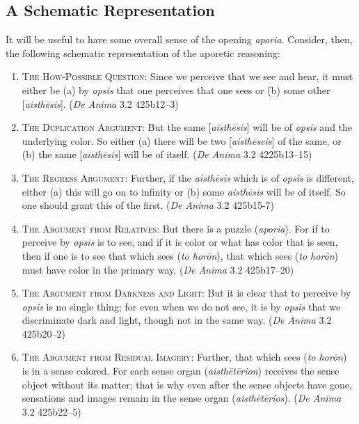 \subsection{A Schematic Representation} %
\label{sub:a_schematic_representation}

It will be useful to have some overall sense of the opening \emph{aporia}. Consider, then, the following schematic representation of the aporetic reasoning:

\begin{enumerate}[(1)]
	\item \textsc{The How-Possible Question}: Since we perceive that we see and hear, it must either be (a) by \emph{opsis} that one perceives that one sees or (b) some other [\emph{aisthēsis}]. (\emph{De Anima} 3.2 425b12–3)
	\item \textsc{The Duplication Argument}: But the same [\emph{aisthēsis}] will be of \emph{opsis} and the underlying color. So either (a) there will be two [\emph{aisthēseis}] of the same, or (b) the same [\emph{aisthēsis}] will be of itself. (\emph{De Anima} 3.2 4225b13–15)
	\item \textsc{The Regress Argument}: Further, if the \emph{aisthēsis} which is of \emph{opsis} is different, either (a) this will go on to infinity or (b) some \emph{aisthēsis} will be of itself. So one should grant this of the first. (\emph{De Anima} 3.2 425b15-7)
	\item \textsc{The Argument from Relatives}: But there is a puzzle (\emph{aporia}). For if to perceive by \emph{opsis} is to see, and if it is color or what has color that is seen, then if one is to see that which sees (\emph{to horōn}), that which sees (\emph{to horōn}) must have color in the primary way. (\emph{De Anima} 3.2 425b17–20)
	\item \textsc{The Argument from Darkness and Light}: But it is clear that to perceive by \emph{opsis} is no single thing; for even when we do not see, it is by \emph{opsis} that we discriminate dark and light, though not in the same way. (\emph{De Anima} 3.2 425b20–2)
	\item \textsc{The Argument from Residual Imagery}: Further, that which sees (\emph{to horōn}) is in a sense colored. For each sense organ (\emph{aisthētērion}) receives the sense object without its matter; that is why even after the sense objects have gone, sensations and images remain in the sense organ (\emph{aisthētēríos}). (\emph{De Anima} 3.2 425b22–5)
\end{enumerate} 

